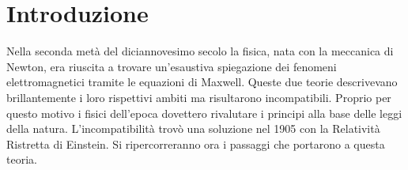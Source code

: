 \chapter{Introduzione}
Nella seconda metà del diciannovesimo secolo la fisica, nata con la meccanica di Newton, 
era riuscita a trovare un'esaustiva spiegazione dei fenomeni elettromagnetici tramite le 
equazioni di Maxwell. Queste due teorie descrivevano brillantemente i loro rispettivi ambiti 
ma risultarono incompatibili. Proprio per questo motivo i fisici dell'epoca dovettero rivalutare 
i principi alla base delle leggi della natura. L'incompatibilità trovò una soluzione nel 1905 con 
la Relatività Ristretta di Einstein. Si ripercorreranno ora i passaggi che portarono a questa teoria.


